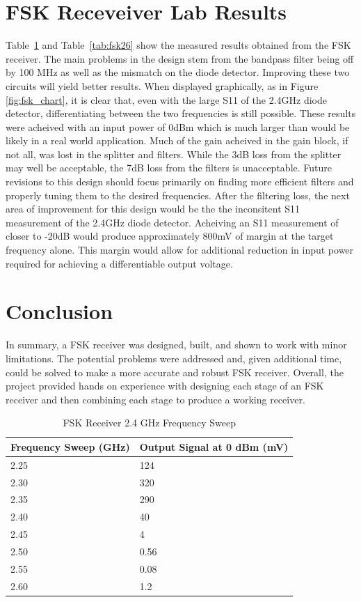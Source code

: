 \documentclass[conference]{IEEEtran}
\begin{document}
\section{FSK Receveiver Lab Results}
Table~\ref{tab:fsk24} and Table~\ref{tab:fsk26} show the measured results obtained from the FSK receiver. The main problems in the design stem from the bandpass filter being off by 100 MHz as well as the mismatch on the diode detector. Improving these two circuits will yield better results. When displayed graphically, as in Figure \ref{fig:fsk_chart}, it is clear that, even with the large S11 of the 2.4GHz diode detector, differentiating between the two frequencies is still possible. These results were acheived with an input power of 0dBm which is much larger than would be likely in a real world application. Much of the gain acheived in the gain block, if not all, was lost in the splitter and filters. While the 3dB loss from the splitter may well be acceptable, the 7dB loss from the filters is unacceptable. Future revisions to this design should focus primarily on finding more efficient filters and properly tuning them to the desired frequencies. After the filtering loss, the next area of improvement for this design would be the the inconsitent S11 measurement of the 2.4GHz diode detector. Acheiving an S11 measurement of closer to -20dB would produce approximately 800mV of margin at the target frequency alone. This margin would allow for additional reduction in input power required for achieving a differentiable output voltage.

\section{Conclusion}
In summary, a FSK receiver was designed, built, and shown to work with minor limitations.  The potential problems were addressed and, given additional time, could be solved to make a more accurate and robust FSK receiver.  Overall, the project provided hands on experience with designing each stage of an FSK receiver and then combining each stage to produce a working receiver.
\begin{table}
\caption{FSK Receiver 2.4 GHz Frequency Sweep}
\begin{tabular}{|l|l|}
\hline
Frequency Sweep (GHz) & Output Signal at 0 dBm (mV) \\\hline
2.25 & 124 \\\hline
2.30 & 320 \\\hline
2.35 & 290 \\\hline
2.40 & 40 \\\hline
2.45 & 4 \\\hline
2.50 & 0.56 \\\hline
2.55 & 0.08 \\\hline
2.60 & 1.2 \\\hline
\end{tabular}
\label{tab:fsk24}
\end{table}
\end{document}
